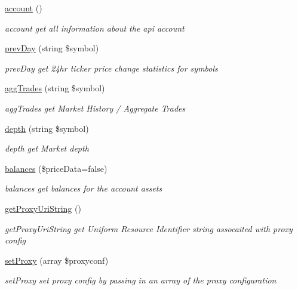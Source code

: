 \begin{DoxyCompactItemize}
\hyperlink{classBinance_1_1API_a14272f6a80009bc8fd742b5f35fee9a5}{account} ()
\begin{DoxyCompactList}\small\item\em account get all information about the api account \end{DoxyCompactList}\item 
\hyperlink{classBinance_1_1API_a3568ed724dfba2eaf6dcfd91b936dc6f}{prev\-Day} (string \$symbol)
\begin{DoxyCompactList}\small\item\em prev\-Day get 24hr ticker price change statistics for symbols \end{DoxyCompactList}\item 
\hyperlink{classBinance_1_1API_af047ce7afeff0729b62fb28b2697ad9f}{agg\-Trades} (string \$symbol)
\begin{DoxyCompactList}\small\item\em agg\-Trades get Market History / Aggregate Trades \end{DoxyCompactList}\item 
\hyperlink{classBinance_1_1API_ac36901dbea220b2401786a6d1bc4d051}{depth} (string \$symbol)
\begin{DoxyCompactList}\small\item\em depth get Market depth \end{DoxyCompactList}\item 
\hyperlink{classBinance_1_1API_afe968feb47f5b68853dae571cb75800c}{balances} (\$price\-Data=false)
\begin{DoxyCompactList}\small\item\em balances get balances for the account assets \end{DoxyCompactList}\item 
\hyperlink{classBinance_1_1API_af1d41534a9f67bc74a6133efa2df4df7}{get\-Proxy\-Uri\-String} ()
\begin{DoxyCompactList}\small\item\em get\-Proxy\-Uri\-String get Uniform Resource Identifier string assocaited with proxy config \end{DoxyCompactList}\item 
\hyperlink{classBinance_1_1API_a3647415e517c745a35d2d54bb27575fe}{set\-Proxy} (array \$proxyconf)
\begin{DoxyCompactList}\small\item\em set\-Proxy set proxy config by passing in an array of the proxy configuration \end{DoxyCompactList}\item 

\end{DoxyCompactItemize}
